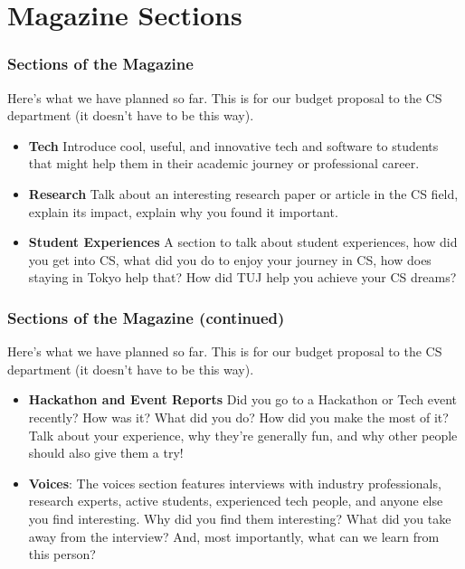 \documentclass{beamer}
\begin{document}
\section{Magazine Sections}
\begin{frame}
    \frametitle{Sections of the Magazine}

        Here's what we have planned so far. This is for our budget proposal to the CS department (it doesn't have to be this way).

        \hspace{0.4pt}
        \pause
        
        \begin{itemize}

            \item<2-> \textbf{Tech} Introduce cool, useful, and innovative tech and software to students that might help them in their academic journey or professional career.

            \item<3-> \textbf{Research} Talk about an interesting research paper or article in the CS field, explain its impact, explain why you found it important.

            \item<4-> \textbf{Student Experiences} A section to talk about student experiences, how did you get into CS, what did you do to enjoy your journey in CS, how does staying in Tokyo help that? How did TUJ help you achieve your CS dreams?

        \end{itemize}
\end{frame}

\begin{frame}
    \frametitle{Sections of the Magazine (continued)}

        Here's what we have planned so far. This is for our budget proposal to the CS department (it doesn't have to be this way).

        \hspace{0.4pt}
        \pause
        
        \begin{itemize}

            \item<2-> \textbf{Hackathon and Event Reports} Did you go to a Hackathon or Tech event recently? How was it? What did you do? How did you make the most of it? Talk about your experience, why they're generally fun, and why other people should also give them a try!

            \item<3-> \textbf{Voices}: The voices section features interviews with industry professionals, research experts, active students, experienced tech people, and anyone else you find interesting. Why did you find them interesting? What did you take away from the interview? And, most importantly, what can we learn from this person? 

        \end{itemize}

\end{frame}
\end{document}
